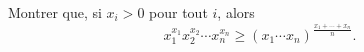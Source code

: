 Montrer que, si $x_i > 0$ pour tout $i$, alors
\[ x_1^{x_1}x_2^{x_2} \cdots x_n^{x_n} \geq (x_1 \cdots x_n)^{\frac{x_1 + \cdots + x_n}{n}}. \]
